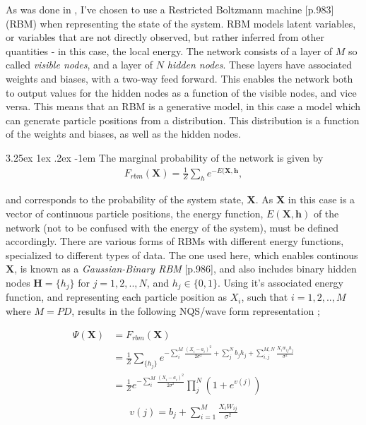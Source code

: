 \documentclass[%
oneside,                 %
final,                   %
10pt]{article}
\makeatletter
\renewcommand\paragraph{\@startsection{paragraph}{5}{\z@}%
  {3.25ex \@plus1ex \@minus.2ex}%
  {-1em}%
  {\normalfont\normalsize\bfseries}}
\makeatother
\begin{document}
As was done in \citep{CarleoGiuseppe2017Stqm}, I've chosen to use a Restricted Boltzmann machine \cite{MLMurphy}[p.983] (RBM) when representing the state of the system. RBM models latent variables, or variables that are not directly observed, but rather inferred from other quantities - in this case, the local energy. The network consists of a layer of $M$ so called \textit{visible nodes}, and a layer of $N$ \textit{hidden nodes}. These layers have associated weights and biases, with a two-way feed forward. This enables the network both to output values for the hidden nodes as a function of the visible nodes, and vice versa. This means that an RBM is a generative model, in this case a model which can generate particle positions from a distribution. This distribution is a function of the weights and biases, as well as the hidden nodes. 


\paragraph{The marginal probability of the network} is given by
\begin{equation*}
\begin{aligned}
F_{rbm}(\bm X) = \frac{1}{Z} \sum_h e^{-E(\bm X, \bm h} ,
\end{aligned}
\label{eq:TWF}
\end{equation*}



and corresponds to the probability of the system state, $\bm X$. As $\bm X$ in this case is a vector of continuous particle positions, the energy function, $E(\bm X, \bm h)$ of the network (not to be confused with the energy of the system), must be defined accordingly. There are various forms of RBMs with different energy functions, specialized to different types of data. The one used here, which enables continous $\bm X$, is known as a \textit{Gaussian-Binary RBM} \cite{MLMurphy}[p.986], and also includes binary hidden nodes $\bm H=\{h_j\}$ for $j=1,2,..,N$, and $h_j \in \{0,1\}$. Using it's associated energy function, and representing each particle position as $X_i$, such that $i=1,2,..,M$ where $M=PD$, results in the following NQS/wave form representation \cite{MLoppgave}; 

\begin{equation}
\begin{aligned}
\Psi (\mathbf{X}) &= F_{rbm}(\mathbf{X}) \\
&= \frac{1}{Z} \sum_{\{h_j\}} e^{-\sum_i^M \frac{(X_i - a_i)^2}{2\sigma^2} + \sum_j^N b_j h_j + \sum_{i,j}^{M,N} \frac{X_i w_{ij} h_j}{\sigma^2}} \\
&= \frac{1}{Z} e^{-\sum_i^M \frac{(X_i - a_i)^2}{2\sigma^2}} \prod_j^N (1 + e^{ v(j)}) \\
\end{aligned}
\label{eq:TWF}
\end{equation}
\begin{equation}
\begin{aligned}
v(j) = b_j + \sum_{i=1}^M \frac{X_i W_{ij} }{\sigma^2}
\end{aligned}
\label{eq:v_j}
\end{equation}
\end{document}
